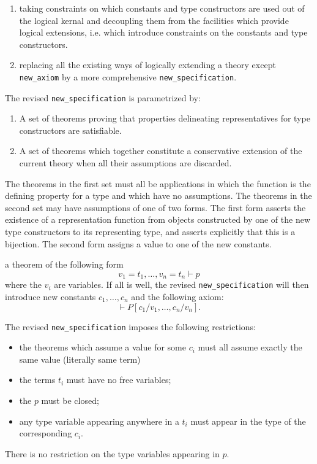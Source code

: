 \documentclass[12pt]{article}
\def\NewSpec{{\tt new\_specification}}
\begin{document}
\begin{enumerate}
\item taking constraints on which constants and type constructors are used out of the logical kernal and decoupling them from the facilities which provide logical extensions, i.e. which introduce constraints on the constants and type constructors.
\item replacing all the existing ways of logically extending a theory except {\tt new\_axiom} by a more comprehensive {\NewSpec}.
\end{enumerate}

The revised {\NewSpec} is parametrized by:

\begin{enumerate}
\item A set of theorems proving that properties delineating representatives for type constructors are satisfiable.
\item A set of theorems which together constitute a conservative extension of the current theory when all their assumptions are discarded.
\end{enumerate}

The theorems in the first set must all be applications in which the function is the defining property for a type and which have no assumptions.
The theorems in the second set may have assumptions of one of two forms.
The first form asserts the existence of a representation function from objects constructed by one of the new type constructors to its representing type, and asserts explicitly that this is a bijection.
The second form assigns a value to one of the new constants.

 a theorem of the following form
$$
v_1 = t_1, \ldots, v_n = t_n \vdash p
$$
where the $v_i$ are variables. If all is well, the revised {\NewSpec} will then introduce new constants $c_1, \ldots, c_n$ and the following axiom:
$$
\vdash P[c_1/v_1, \ldots, c_n/v_n].
$$

The revised {\NewSpec} imposes the following restrictions:
\begin{itemize}
\item the theorems which assume a value for some $c_i$ must all assume exactly the same value (literally same term)
\item the terms $t_i$ must have no free variables;
\item the $p$ must be closed;
\item any type variable appearing anywhere in a $t_i$ must appear in the type of the corresponding $c_i$.
\end{itemize}
There is no restriction on the type variables appearing in $p$.
\end{document}
